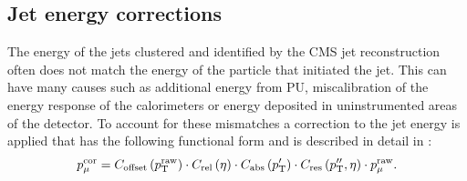 \subsection{Jet energy corrections}
\label{sec:jec}
The energy of the jets clustered and identified by the CMS jet reconstruction often does not match the energy of the particle that initiated the jet. This can have many causes such as additional energy from \ac{PU}, miscalibration of the energy response of the calorimeters or energy deposited in uninstrumented areas of the detector. To account for these mismatches a correction to the jet energy is applied that has the following functional form and is described in detail in : 
\begin{equation}
  p_{\mu}^{\rm{cor}}=C_{\rm{offset}}\left(p_{\mathrm{T}}^{\rm{raw}}\right)\cdot C_{\rm{rel}}\left(\eta\right)\cdot C_{\rm{abs}}\left(p_{\mathrm{T}}'\right)\cdot C_{\rm{res}}\left(p_{\mathrm{T}}'',\eta\right)\cdot p_{\mu}^{\rm{raw}}.
\end{equation}
